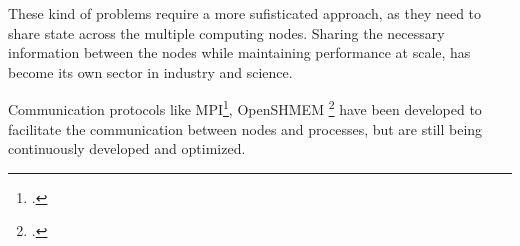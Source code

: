These kind of problems require a more sufisticated approach, as they need to share state across the multiple computing nodes.
Sharing the necessary information between the nodes while maintaining performance at scale, has become its own sector in industry and science.

Communication protocols like \ac{MPI}\footcite{snirMPICompleteReference1998}, \ac{OpenSHMEM} \footcite{chapmanIntroducingOpenSHMEMSHMEM2010}
have been developed to facilitate the communication between nodes and processes, but are still being continuously developed and optimized.
